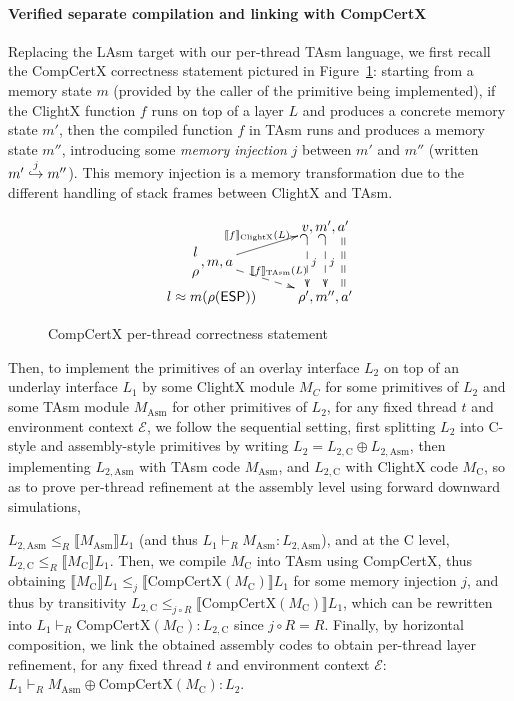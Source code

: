 \paragraph{Verified separate compilation and linking with CompCertX} 
Replacing  the LAsm target with our per-thread TAsm 
language, we first recall the CompCertX correctness statement
pictured in Figure~\ref{fig:compcertx}: starting from a memory state $m$
(provided by the caller of the primitive being implemented), if the
ClightX function $f$ runs on top of a layer $L$ and produces a
concrete memory state $m'$, then the compiled function $f$ in TAsm
runs and produces a memory state $m''$, introducing some \emph{memory
  injection} $j$ between $m'$ and $m''$ (written
$\inject{j}{m'}{m''}$). This memory injection is a memory
transformation \cite[\S 5.4]{leroy08} due to the different handling of
stack frames between ClightX and TAsm.


\begin{figure}
\[
\xymatrix@R=3pt@C+=3pt{
& v, m', a'
\ar@<-3ex>@{_{(}-->}[dd]^j
\ar@{_{(}-->}[dd]^j
\ar@<3ex>@{==}[dd]
\\
\genfrac{}{}{0pt}{0}{l}{\rho}, m, a
\ar[ur]^{\llbracket f \rrbracket_{\text{ClightX}}(L)}
\ar@{-->}[dr]^{ \llbracket f \rrbracket_{\text{TAsm}}(L)} \\
l \approx m(\rho(\textsf{ESP}))
& \rho', m'', a'
}
\]
\caption{CompCertX per-thread correctness statement} \label{fig:compcertx}
\hrulefill
\end{figure}

Then, to implement the primitives of an overlay interface $L_2$ on top
of an underlay interface $L_1$ by some ClightX module $M_C$ for some
primitives of $L_2$ and some TAsm module $M_{\text{Asm}}$ for other
primitives of $L_2$, for any fixed thread $t$ and environment context
$\mathcal E$, we follow the sequential setting, first splitting $L_2$ into C-style
and assembly-style primitives by writing $L_2 = L_{2, \text{C}} \oplus
L_{2, \text{Asm}}$, then implementing $L_{2, \text{Asm}}$ with TAsm
code $M_{\text{Asm}}$, and $L_{2, \text{C}}$ with ClightX code
$M_{\text{C}}$, so as to prove per-thread refinement at the assembly
level using forward downward simulations,
   $L_{2,
  \text{Asm}} \leqslant_R \llbracket M_{\text{Asm}} \rrbracket L_1$
(and thus $L_{1} \vdash_R M_{\text{Asm}} : L_{2, \text{Asm}}$), and at
the C level, $L_{2, \text{C}} \leqslant_R \llbracket M_{\text{C}}
\rrbracket L_1$. Then, we compile $M_{\text{C}}$ into TAsm using
CompCertX, thus obtaining $\llbracket M_{\text{C}} \rrbracket L_1
\leqslant_{j} \llbracket \text{CompCertX}(M_{\text{C}}) \rrbracket
L_1$ for some memory injection $j$, and thus by transitivity $L_{2,
  \text{C}} \leqslant_{j \circ R} \llbracket
\text{CompCertX}(M_{\text{C}}) \rrbracket L_1$, which can be rewritten
into $L_{1} \vdash_R \text{CompCertX}(M_{\text{C}}) : L_{2, \text{C}}$
since $j \circ R = R$. Finally, by horizontal composition, we link the
obtained assembly codes to obtain per-thread layer refinement, for any
fixed thread $t$ and environment context $\mathcal E$: $L_1 \vdash_R
M_{\text{Asm}} \oplus \text{CompCertX}(M_{\text{C}}) : L_2$.

